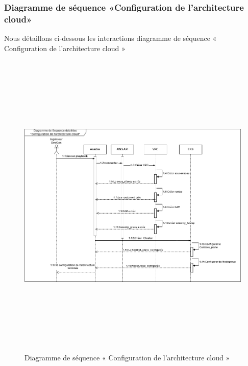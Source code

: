             \subsubsection{\selectfont{}Diagramme de séquence «Configuration de l'architecture cloud»}
            \textsf{Nous détaillons ci-dessous les interactions diagramme de séquence « Configuration de l'architecture cloud » }
            \begin{figure}[H]
                \begin{center}
                \includegraphics[height=15cm,width=18cm]{seqd.drawio.png}
                \end{center}
                \caption{Diagramme de séquence « Configuration de l'architecture cloud » }
                \end{figure}
